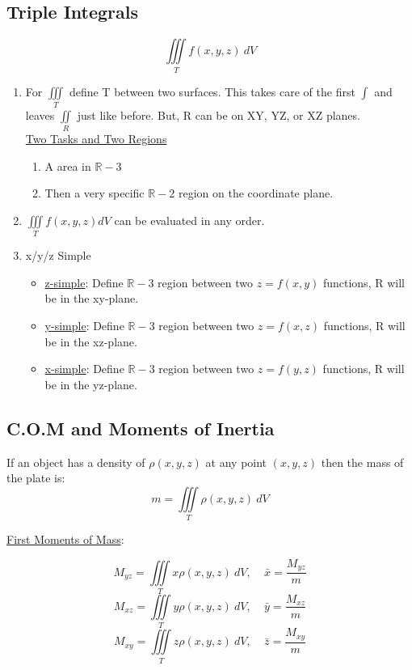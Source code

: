 \documentclass[12pt]{article}
\numberwithin{equation}{subsection}
\newcommand{\indb}{\hspace{1cm}}
\begin{document}
\begin{flushleft}
\subsection{Triple Integrals}
\begin{equation}
\iiint \limits_T f(x,y,z)\ dV
\end{equation}
\begin{enumerate}
\item For $\displaystyle \iiint \limits_T $ define T between two surfaces. This takes care of the first $\displaystyle \int$ and leaves $\iint \limits_R$ just like before. But, R can be on XY, YZ, or XZ planes.\\
\indb \underline{ Two Tasks and Two Regions}
\begin{enumerate}
 \item A area in $\mathbb{R}-3$
 \item Then a very specific $\mathbb{R}-2$ region on the coordinate plane.
\end{enumerate}
\item $\displaystyle \iiint \limits_T f(x,y,z) dV$ can be evaluated in any order.
\item x/y/z Simple\\
\begin{itemize}
\item \underline{z-simple}: Define $\mathbb{R}-3$ region between two $z=f(x,y)$ functions, R will be in the xy-plane. 
\item \underline{y-simple}: Define $\mathbb{R}-3$ region between two $z=f(x,z)$ functions, R will be in the xz-plane. 
\item \underline{x-simple}: Define $\mathbb{R}-3$ region between two $z=f(y,z)$ functions, R will be in the yz-plane. 
\end{itemize}
\end{enumerate}
\newpage
\subsection{C.O.M and Moments of Inertia}
If an object has a density of $\rho (x,y,z) $ at any point $(x,y,z)$ then the mass of the plate is:
\begin{equation}
m=\iiint \limits_T \rho (x,y,z)\ dV
\end{equation}

\noindent \underline{First Moments of Mass}:

\begin{equation}
M_{yz} = \iiint \limits_T  x\rho (x,y,z)\ dV, \ \ \ \ \ \bar{x}=\frac{M_{yz}}{m}
\end{equation}
\begin{equation}
M_{xz} = \iiint \limits_T  y\rho (x,y,z)\ dV, \ \ \ \ \ \bar{y}=\frac{M_{xz}}{m}
\end{equation}
\begin{equation}
M_{xy} = \iiint \limits_T  z\rho (x,y,z)\ dV, \ \ \ \ \ \bar{z}=\frac{M_{xy}}{m}
\end{equation}


\end{flushleft}
\end{document}

